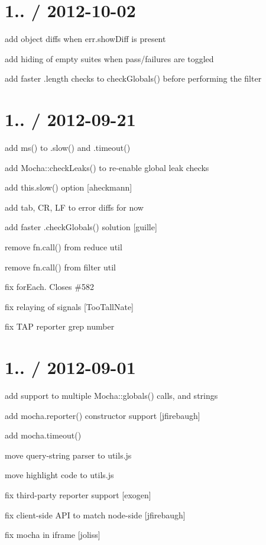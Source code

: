\section*{1.. / 2012-\/10-\/02}


\begin{DoxyItemize}
\item add object diffs when {\ttfamily err.\+show\+Diff} is present
\item add hiding of empty suites when pass/failures are toggled
\item add faster {\ttfamily .length} checks to {\ttfamily check\+Globals()} before performing the filter
\end{DoxyItemize}

\section*{1.. / 2012-\/09-\/21}


\begin{DoxyItemize}
\item add {\ttfamily ms()} to {\ttfamily .slow()} and {\ttfamily .timeout()}
\item add {\ttfamily Mocha\+::check\+Leaks()} to re-\/enable global leak checks
\item add {\ttfamily this.\+slow()} option \mbox{[}aheckmann\mbox{]}
\item add tab, CR, LF to error diffs for now
\item add faster {\ttfamily .check\+Globals()} solution \mbox{[}guille\mbox{]}
\item remove {\ttfamily fn.\+call()} from reduce util
\item remove {\ttfamily fn.\+call()} from filter util
\item fix for\+Each. Closes \#582
\item fix relaying of signals \mbox{[}Too\+Tall\+Nate\mbox{]}
\item fix T\+AP reporter grep number
\end{DoxyItemize}

\section*{1.. / 2012-\/09-\/01}


\begin{DoxyItemize}
\item add support to multiple {\ttfamily Mocha\+::globals()} calls, and strings
\item add {\ttfamily mocha.\+reporter()} constructor support \mbox{[}jfirebaugh\mbox{]}
\item add {\ttfamily mocha.\+timeout()}
\item move query-\/string parser to utils.\+js
\item move highlight code to utils.\+js
\item fix third-\/party reporter support \mbox{[}exogen\mbox{]}
\item fix client-\/side A\+PI to match node-\/side \mbox{[}jfirebaugh\mbox{]}
\item fix mocha in iframe \mbox{[}joliss\mbox{]}
\end{DoxyItemize}

